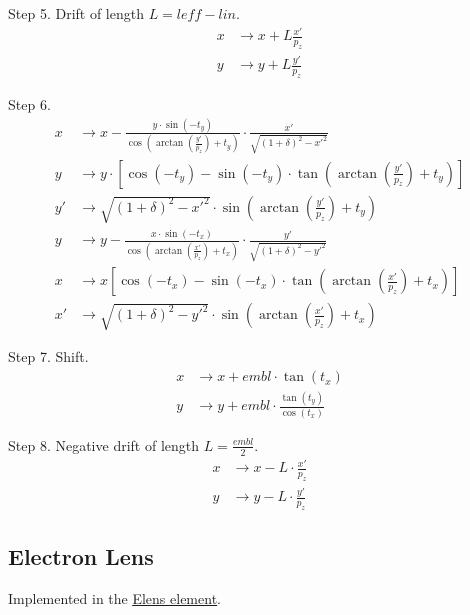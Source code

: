 Step 5. Drift of length $L=leff-lin$.
\begin{align*}
    x &\to x + L \frac{x'}{p_z} \\
    y &\to y + L \frac{y'}{p_z}
\end{align*}

Step 6.
\begin{align*}
	x &\to x - \frac{y\cdot\sin(-t_y)}{
    \cos\left(\arctan\left(\frac{y'}{p_z}\right)+t_y\right)}\cdot
    \frac{x'}{\sqrt{(1+\delta)^2-x'^2}} \\
    y &\to y\cdot\left[\cos(-t_y)-\sin(-t_y)\cdot\tan\left(
    \arctan\left(\frac{y'}{p_z}\right)+t_y\right)\right] \\
    y' &\to \sqrt{(1+\delta)^2-x'^2}\cdot\sin\left(
    \arctan\left(\frac{y'}{p_z}\right)+t_y\right) \\
    y &\to y- \frac{x\cdot\sin(-t_x)}{\cos\left(\arctan\left(\frac{x'}{p_z}\right)
    +t_x\right)} \cdot\frac{y'}{\sqrt{(1+\delta)^2-y'^2}} \\
    x &\to x \left[ \cos(-t_x) - \sin(-t_x)\cdot\tan\left(
    \arctan\left(\frac{x'}{p_z}\right)+t_x\right) \right] \\
    x' &\to \sqrt{(1+\delta)^2-y'^2}\cdot\sin\left(\arctan\left(
    \frac{x'}{p_z}\right)+t_x\right)
\end{align*}

Step 7. Shift.
\begin{align*}
    x &\to x + embl\cdot \tan(t_x) \\
    y &\to y + embl\cdot\frac{\tan(t_y)}{\cos(t_x)}
\end{align*}

Step 8. Negative drift of length $L=\frac{embl}{2}$.
\begin{align*}
    x &\to x - L\cdot \frac{x'}{p_z} \\
    y &\to y - L\cdot \frac{y'}{p_z}
\end{align*}


\subsection{Electron Lens}

Implemented in the \href{https://xsuite.readthedocs.io/en/latest/apireference.html#elens}{\underline{Elens element}}.

\label{elense}
